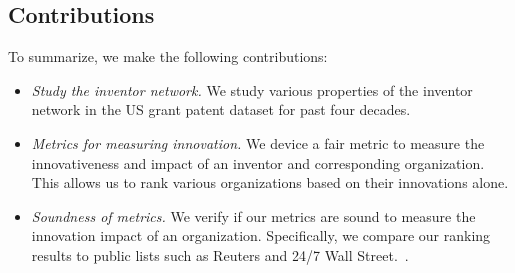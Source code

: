 \subsection{Contributions}

To summarize, we make the following contributions:

	\begin{itemize} 
	\squish
		\item {\em Study the inventor network.} We study various properties of the inventor network in the US grant patent dataset for past four decades.  
		\item {\em Metrics for measuring innovation.} We device a fair metric to measure the innovativeness and impact of an inventor and corresponding organization. This allows us to rank various organizations based on their innovations alone. 
		\item {\em Soundness of metrics.} We verify if our metrics are sound to measure the innovation impact of an organization. Specifically, we compare our ranking results to public lists such as Reuters and 24/7 Wall Street.~\cite{top100, 247wallst}.
	\end{itemize}